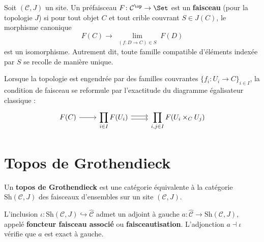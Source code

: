 \begin{definition}\label{def:faisceau-site}
Soit $(\mathcal{C}, J)$ un site.  Un préfaisceau
$F \colon \mathcal{C}^\op \to \Set$ est un \textbf{faisceau}
(pour la topologie $J$) si pour tout objet $C$ et tout crible
couvrant $S \in J(C)$, le morphisme canonique
\[
  F(C) \longrightarrow \lim_{\substack{(f \colon D \to C) \in S}} F(D)
\]
est un isomorphisme.  Autrement dit, toute famille compatible d'éléments
indexée par $S$ se recolle de manière unique.
\end{definition}

\begin{remarque}\label{rem:faisceau-egalisateur}
Lorsque la topologie est engendrée par des familles couvrantes
$\{f_i \colon U_i \to C\}_{i \in I}$, la condition de faisceau
se reformule par l'exactitude du diagramme égalisateur classique :
\[
\begin{tikzcd}
F(C) \arrow[r] &
\displaystyle\prod_{i \in I} F(U_i)
  \arrow[r, shift left=0.5ex]
  \arrow[r, shift right=0.5ex] &
\displaystyle\prod_{i,j \in I} F(U_i \times_C U_j)
\end{tikzcd}
\]
\end{remarque}

\section{Topos de Grothendieck}\label{sec:topos-grothendieck}

\begin{definition}\label{def:topos-grothendieck}
Un \textbf{topos de Grothendieck} est une catégorie équivalente
à la catégorie $\mathrm{Sh}(\mathcal{C}, J)$ des faisceaux d'ensembles
sur un site $(\mathcal{C}, J)$.
\end{definition}

\begin{proposition}[Faisceautisation]\label{prop:faisceautisation}
L'inclusion $\iota \colon \mathrm{Sh}(\mathcal{C}, J) \hookrightarrow
\widehat{\mathcal{C}}$ admet un adjoint à gauche
$a \colon \widehat{\mathcal{C}} \to \mathrm{Sh}(\mathcal{C}, J)$,
appelé \textbf{foncteur faisceau associé} ou \textbf{faisceautisation}.
L'adjonction $a \dashv \iota$ vérifie que $a$ est exact à gauche.
\end{proposition}

